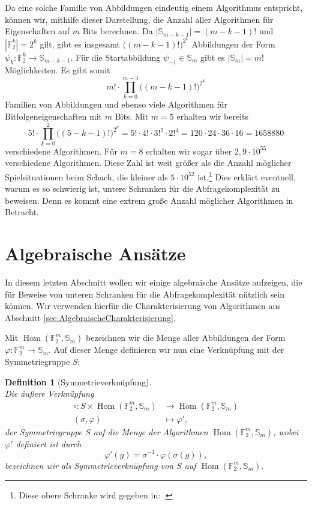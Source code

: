 \documentclass[10pt,a4paper, footheight=1mm, bibliography=totoc]{scrreprt}
\newtheorem{definition}{Definition}
\theoremstyle{definition}
\DeclareMathOperator\Hom{Hom}
\begin{document}
Da eine solche Familie von Abbildungen eindeutig
einem Algorithmus entspricht, können wir, mithilfe dieser Darstellung,
die Anzahl aller Algorithmen für Eigenschaften auf $m$ Bits
berechnen. Da $|\mathbb{S}_{m-k-1}|=(m-k-1)!$ und
$|\mathbb{F}_2^k| = 2^k$ gilt, gibt es
insgesamt $\big((m-k-1)!\big)^{2^k}$ Abbildungen der Form
$\psi_k:\mathbb{F}_2^k \to \mathbb{S}_{m-k-1}$.
Für die Startabbildung $\psi_{-1}\in\mathbb{S}_m$ gibt
es $|\mathbb{S}_m| = m!$ Möglichkeiten.
Es gibt somit
$$m!\cdot \prod_{k=0}^{m-3} \big((m-k-1)!\big)^{2^k} $$
Familien von Abbildungen und ebenso viele Algorithmen
für Bitfolgeneigenschaften mit $m$ Bits.
Mit $m=5$ erhalten wir bereits 
$$5!\cdot \prod_{k=0}^2 \big((5-k-1)!\big)^{2^k}
= 5!\cdot 4! \cdot 3!^2 \cdot 2!^4
= 120 \cdot 24 \cdot 36 \cdot 16 = 1658880
$$
verschiedene Algorithmen. Für $m=8$ erhalten wir sogar
über $2,9 \cdot 10^{55}$ verschiedene Algorithmen. Diese
Zahl ist weit größer als die Anzahl möglicher 
Spielsituationen beim Schach, die kleiner als $5\cdot 10^{52}$
ist.\footnote{Diese obere Schranke wird gegeben in:
\cite[S.172]{Allis}.}
Dies erklärt eventuell, warum es so schwierig ist, untere
Schranken für die Abfragekomplexität zu beweisen. Denn
es kommt eine extrem große Anzahl möglicher Algorithmen
in Betracht.

\section{Algebraische Ansätze}
\label{sec:AlgebraischeAnsaetze}
In diesem letzten Abschnitt wollen wir einige algebraische
Ansätze aufzeigen, die für Beweise von unteren
Schranken für die Abfragekomplexität nützlich sein können.
Wir verwenden hierfür die Charakterisierung von Algorithmen
aus Abschnitt \ref{sec:AlgebraischeCharakterisierung}.

Mit $\Hom(\mathbb{F}_2^m, \mathbb{S}_m)$ bezeichnen wir die
Menge aller Abbildungen der Form 
$\varphi: \mathbb{F}_2^m \to \mathbb{S}_m$.
Auf dieser Menge definieren wir nun eine Verknüpfung
mit der Symmetriegruppe $S$:

\begin{definition}
[Symmetrieverknüpfung]
\label{def:Symmetrieverknuepfung}
\ \\
Die äußere Verknüpfung
\begin{align*} 
\circ: S \times \Hom(\mathbb{F}_2^m, \mathbb{S}_m) &\to 
\Hom(\mathbb{F}_2^m, \mathbb{S}_m) \\
(\sigma, \varphi) &\mapsto \varphi',
\end{align*}
der Symmetriegruppe $S$ auf die Menge der Algorithmen 
$\Hom(\mathbb{F}_2^m, \mathbb{S}_m)$, wobei $\varphi'$ definiert ist durch 
$$\varphi'(g)=\sigma^{-1} \cdot \varphi(\sigma(g)),$$
bezeichnen wir als \emph{Symmetrieverknüpfung} von
$S$ auf  $\Hom(\mathbb{F}_2^m, \mathbb{S}_m)$.
\end{definition}
\end{document}
